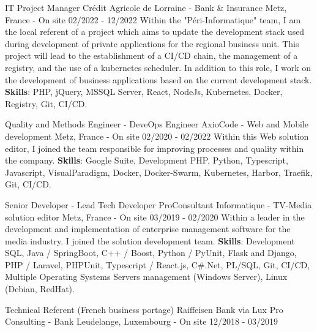 \begin{cventries}
  \cventry
    {IT Project Manager} %
    {Crédit Agricole de Lorraine - Bank \& Insurance} %
    {Metz, France - On site} %
    {02/2022 - 12/2022} %
    {
        Within the "Péri-Informatique" team, I am the local referent of a project which aims to
        update the development stack used during development of private applications for the
        regional business unit.
        \newline
        This project will lead to the establishment of a CI/CD chain, the management of a 
        registry, and the use of a kubernetes scheduler.
        \newline
        In addition to this role, I work on the development of business applications based 
        on the current development stack.
        \newline
        \textbf{Skills}: PHP, jQuery, MSSQL Server, React, NodeJs, Kubernetes, Docker, Registry, Git, CI/CD.
    }

  \cventry
    {Quality and Methods Engineer - DeveOps Engineer} %
    {AxioCode - Web and Mobile development} %
    {Metz, France - On site} %
    {02/2020 - 02/2022} %
    {
        Within this Web solution editor, I joined the team responsible for improving processes and quality within the company.
        \newline
        \textbf{Skills}: Google Suite, Development PHP, Python, Typescript, Javascript, VisualParadigm, Docker, Docker-Swarm, Kubernetes, Harbor, Traefik, Git, CI/CD.
    }

  \cventry
    {Senior Developer - Lead Tech Developer} %
    {ProConsultant Informatique - TV-Media solution editor} %
    {Metz, France - On site} %
    {03/2019 - 02/2020} %
    {
        Within a leader in the development and implementation of enterprise management software for the media industry. I joined the solution development team.
        \newline
        \textbf{Skills}: Development SQL, Java / SpringBoot, C++ / Boost, Python / PyUnit, Flask and Django, PHP / Laravel, PHPUnit, Typescript / React.js, C\#.Net, PL/SQL, Git, CI/CD, Multiple Operating Systems Servers management (Windows Server), Linux (Debian, RedHat).
    }

  \cventry
    {Technical Referent (French business portage)} %
    {Raiffeisen Bank via Lux Pro Consulting - Bank} %
    {Leudelange, Luxembourg - On site} %
    {12/2018 - 03/2019} %
    {
    }


\end{cventries}
